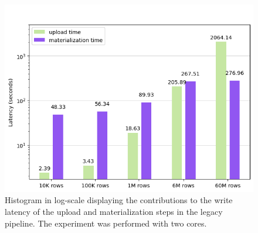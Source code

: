\begin{figure}
\begin{minipage}[b]{\textwidth}
        \includegraphics[width=\textwidth]{figures/99-appendix/results-diagrams/write/hudi_upload_materialize/hudi_virtualiz_2_core.png}
        \caption[Histogram of the write on legacy pipeline - Time breakdown - 2 CPU cores]{Histogram in log-scale displaying the contributions to the write latency of the upload and materialization steps in the legacy pipeline. The experiment was performed with two  cores.}
        \label{fig:appx_hudi_virtualiz_breakdown_2_core}
    \end{minipage}
\end{figure}

